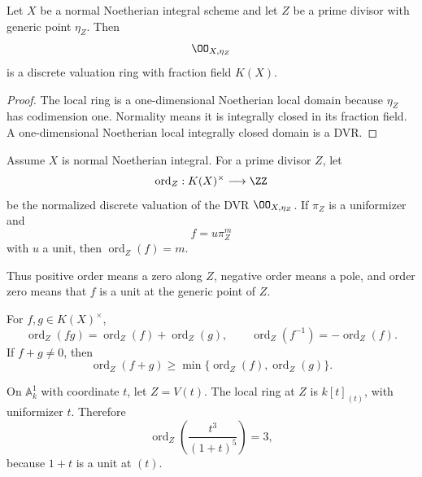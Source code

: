 \begin{theorem}\label{thm:vi39-normal-dvr}
Let \(X\) be a normal Noetherian integral scheme and let \(Z\) be a prime divisor with generic point \(\eta_Z\).  Then
\[
 \OO_{X,\eta_Z}
\]
is a discrete valuation ring with fraction field \(K(X)\).
\end{theorem}

\begin{proof}
The local ring is a one-dimensional Noetherian local domain because \(\eta_Z\) has codimension one.  Normality means it is integrally closed in its fraction field.  A one-dimensional Noetherian local integrally closed domain is a DVR.
\end{proof}



\begin{definition}\label{def:vi39-order}
Assume \(X\) is normal Noetherian integral.  For a prime divisor \(Z\), let
\[
 \operatorname{ord}_Z:K(X)^\times\longrightarrow\ZZ
\]
be the normalized discrete valuation of the DVR \(\OO_{X,\eta_Z}\).  If \(\pi_Z\) is a uniformizer and
\[
 f=u\pi_Z^m
\]
with \(u\) a unit, then \(\operatorname{ord}_Z(f)=m\).
\end{definition}

Thus positive order means a zero along \(Z\), negative order means a pole, and order zero means that \(f\) is a unit at the generic point of \(Z\).



\begin{proposition}\label{prop:vi39-valuation-rules}
For \(f,g\in K(X)^\times\),
\[
\operatorname{ord}_Z(fg)=\operatorname{ord}_Z(f)+\operatorname{ord}_Z(g),
\qquad
\operatorname{ord}_Z(f^{-1})=-\operatorname{ord}_Z(f).
\]
If \(f+g\ne0\), then
\[
\operatorname{ord}_Z(f+g)\ge
\min\{\operatorname{ord}_Z(f),\operatorname{ord}_Z(g)\}.
\]
\end{proposition}

\begin{example}\label{ex:vi39-basic-order}
On \(\mathbb{A}^1_k\) with coordinate \(t\), let \(Z=V(t)\).  The local ring at \(Z\) is \(k[t]_{(t)}\), with uniformizer \(t\).  Therefore
\[
 \operatorname{ord}_Z\!\left(\frac{t^3}{(1+t)^5}\right)=3,
\]
because \(1+t\) is a unit at \((t)\).
\end{example}

